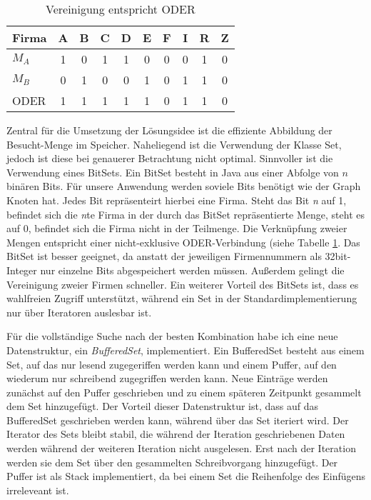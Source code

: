 \begin{table}
	\centering
    \begin{tabular}{l|ccccccccc}
    Firma 	& A & B & C & D & E & F & I & R & Z \\ \hline
    \(M_A\)	& 1 & 0 & 1 & 1 & 0 & 0 & 0 & 1 & 0 \\
    \(M_B\)	& 0 & 1 & 0 & 0 & 1 & 0 & 1 & 1 & 0 \\ \hhline{=|*{9}{=}}
    ODER 	& 1 & 1 & 1 & 1 & 1 & 0 & 1 & 1 & 0 \\
    \end{tabular}
    \caption {Vereinigung entspricht ODER}
    \label{tab:veroder}
\end{table}
Zentral für die Umsetzung der Lösungsidee ist die effiziente Abbildung der Besucht-Menge im Speicher. Naheliegend ist die Verwendung der Klasse Set, jedoch ist diese bei genauerer Betrachtung nicht optimal. Sinnvoller ist die Verwendung eines BitSets. Ein BitSet besteht in Java aus einer Abfolge von \(n\) binären Bits. Für unsere Anwendung werden soviele Bits benötigt wie der Graph Knoten hat. Jedes Bit repräsenteirt hierbei eine Firma. Steht das Bit \textit{n} auf 1, befindet sich die \textit{n}te Firma in der durch das BitSet repräsentierte Menge, steht es auf 0, befindet sich die Firma nicht in der Teilmenge. Die Verknüpfung zweier Mengen entspricht einer nicht-exklusive ODER-Verbindung (siehe Tabelle \ref{tab:veroder}. Das BitSet ist besser geeignet, da anstatt der jeweiligen Firmennummern als 32bit-Integer nur einzelne Bits abgespeichert werden müssen. Außerdem gelingt die Vereinigung zweier Firmen schneller. Ein weiterer Vorteil des BitSets ist, dass es wahlfreien Zugriff unterstützt, während ein Set in der Standardimplementierung nur über Iteratoren auslesbar ist.

Für die vollständige Suche nach der besten Kombination habe ich eine neue Datenstruktur, ein \textit{BufferedSet}, implementiert. Ein BufferedSet besteht aus einem Set, auf das nur lesend zugegeriffen werden kann und einem Puffer, auf den wiederum nur schreibend zugegriffen werden kann. Neue Einträge werden zunächst auf den Puffer geschrieben und zu einem späteren Zeitpunkt gesammelt dem Set hinzugefügt. Der Vorteil dieser Datenstruktur ist, dass auf das BufferedSet geschrieben werden kann, während über das Set iteriert wird. Der Iterator des Sets bleibt stabil, die während der Iteration geschriebenen Daten werden während der weiteren Iteration nicht ausgelesen. Erst nach der Iteration werden sie dem Set über den gesammelten Schreibvorgang hinzugefügt. Der Puffer ist als Stack implementiert, da bei einem Set die Reihenfolge des Einfügens irreleveant ist.

